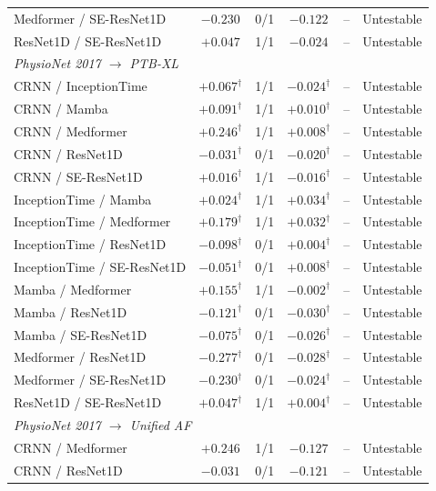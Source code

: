 \begin{table}[ht]
\begin{tabular}{lccccl}
Medformer / SE-ResNet1D & $-0.230$ & 0/1 & $-0.122$ & -- & Untestable \\
ResNet1D / SE-ResNet1D & $+0.047$ & 1/1 & $-0.024$ & -- & Untestable \\
\midrule
\multicolumn{6}{l}{\textit{PhysioNet 2017 $\rightarrow$ PTB-XL}} \\
CRNN / InceptionTime & $+0.067^{\dagger}$ & 1/1 & $-0.024^{\dagger}$ & -- & Untestable \\
CRNN / Mamba & $+0.091^{\dagger}$ & 1/1 & $+0.010^{\dagger}$ & -- & Untestable \\
CRNN / Medformer & $+0.246^{\dagger}$ & 1/1 & $+0.008^{\dagger}$ & -- & Untestable \\
CRNN / ResNet1D & $-0.031^{\dagger}$ & 0/1 & $-0.020^{\dagger}$ & -- & Untestable \\
CRNN / SE-ResNet1D & $+0.016^{\dagger}$ & 1/1 & $-0.016^{\dagger}$ & -- & Untestable \\
InceptionTime / Mamba & $+0.024^{\dagger}$ & 1/1 & $+0.034^{\dagger}$ & -- & Untestable \\
InceptionTime / Medformer & $+0.179^{\dagger}$ & 1/1 & $+0.032^{\dagger}$ & -- & Untestable \\
InceptionTime / ResNet1D & $-0.098^{\dagger}$ & 0/1 & $+0.004^{\dagger}$ & -- & Untestable \\
InceptionTime / SE-ResNet1D & $-0.051^{\dagger}$ & 0/1 & $+0.008^{\dagger}$ & -- & Untestable \\
Mamba / Medformer & $+0.155^{\dagger}$ & 1/1 & $-0.002^{\dagger}$ & -- & Untestable \\
Mamba / ResNet1D & $-0.121^{\dagger}$ & 0/1 & $-0.030^{\dagger}$ & -- & Untestable \\
Mamba / SE-ResNet1D & $-0.075^{\dagger}$ & 0/1 & $-0.026^{\dagger}$ & -- & Untestable \\
Medformer / ResNet1D & $-0.277^{\dagger}$ & 0/1 & $-0.028^{\dagger}$ & -- & Untestable \\
Medformer / SE-ResNet1D & $-0.230^{\dagger}$ & 0/1 & $-0.024^{\dagger}$ & -- & Untestable \\
ResNet1D / SE-ResNet1D & $+0.047^{\dagger}$ & 1/1 & $+0.004^{\dagger}$ & -- & Untestable \\
\midrule
\multicolumn{6}{l}{\textit{PhysioNet 2017 $\rightarrow$ Unified AF}} \\
CRNN / Medformer & $+0.246$ & 1/1 & $-0.127$ & -- & Untestable \\
CRNN / ResNet1D & $-0.031$ & 0/1 & $-0.121$ & -- & Untestable \\

\end{tabular}
\end{table}
